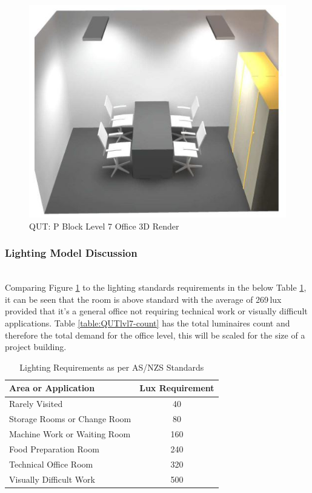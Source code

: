 \begin{figure}[H]
	\hfill\includegraphics[width = 130mm]{images/project-model/dialux-office-3D}\hspace*{\fill}
	\caption{QUT: P Block Level 7 Office 3D Render} 
	\label{fig:dialux-office-3D}
\end{figure}

\subsubsection{Lighting Model Discussion}
~\\
Comparing Figure \ref{fig:dialux-office-3D} to the lighting standards requirements in the below Table \ref{table:LightingRequirements2}, it can be seen that the room is above standard with the average of 269\,lux provided that it's a general office not requiring technical work or visually difficult applications. Table \ref{table:QUTlvl7-count} has the total luminaires count and therefore the total demand for the office level, this will be scaled for the size of a project building.    

\begin{table}[H]
	\centering
	\renewcommand{\arraystretch}{1}
	\begin{tabular}{|l|c|}
		\hline
		\textbf{Area or Application} 	& \textbf{Lux Requirement} \\ \hline
		Rarely Visited 					& 40 \\ \hline
		Storage Rooms or Change Room 	& 80 \\ \hline
		Machine Work or Waiting Room 	& 160 \\ \hline
		Food Preparation Room 			& 240 \\ \hline
		Technical Office Room 			& 320 \\ \hline
		Visually Difficult Work 		& 500 \\ \hline
	\end{tabular}
	\caption{Lighting Requirements as per AS/NZS Standards \cite{StandardsAustralia2006_2}}
	\label{table:LightingRequirements2}
\end{table}  


